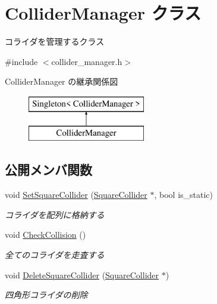 \hypertarget{class_collider_manager}{}\section{Collider\+Manager クラス}
\label{class_collider_manager}


コライダを管理するクラス  




{\ttfamily \#include $<$collider\+\_\+manager.\+h$>$}

Collider\+Manager の継承関係図\begin{figure}[H]
\begin{center}
\leavevmode
\includegraphics[height=2.000000cm]{class_collider_manager}
\end{center}
\end{figure}
\subsection*{公開メンバ関数}
\begin{DoxyCompactItemize}
\item 
void \mbox{\hyperlink{class_collider_manager_a9e6c7ca21ae4e79fdf4892982e72bc99}{Set\+Square\+Collider}} (\mbox{\hyperlink{class_square_collider}{Square\+Collider}} $\ast$, bool is\+\_\+static)
\begin{DoxyCompactList}\small\item\em コライダを配列に格納する \end{DoxyCompactList}\item 
void \mbox{\hyperlink{class_collider_manager_af3863143e206b4c86c8b89dd91ff3c8c}{Check\+Collision}} ()
\begin{DoxyCompactList}\small\item\em 全てのコライダを走査する \end{DoxyCompactList}\item 
void \mbox{\hyperlink{class_collider_manager_a24df637a6f092602b547c6a2bd773113}{Delete\+Square\+Collider}} (\mbox{\hyperlink{class_square_collider}{Square\+Collider}} $\ast$)
\begin{DoxyCompactList}\small\item\em 四角形コライダの削除 \end{DoxyCompactList}\end{DoxyCompactItemize}
